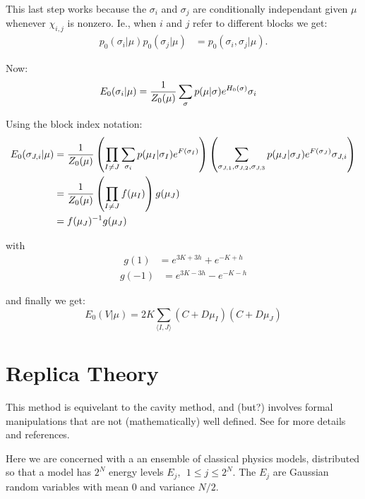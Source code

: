\documentclass[11pt]{article}
\begin{document}
This last step works because the $\sigma_i$ and $\sigma_j$ are
conditionally independant given $\mu$ whenever $\chi_{i, j}$ is
nonzero. Ie., when $i$ and $j$ refer to different blocks we get:
\begin{align*}
p_{0}(\sigma_{i} | \mu)p_{0}(\sigma_{j} | \mu) &= p_{0}(\sigma_{i}, \sigma_{j} | \mu).
\end{align*}

Now:
\begin{align*}
E_{0}(\sigma_{i} | \mu) &= {{1} \over {Z_{0}(\mu)}}\sum_{\sigma} p(\mu | \sigma)e^{H_{0}(\sigma)}\sigma_{i}
\end{align*}

Using the block index notation:
\begin{align*}
E_{0}(\sigma_{J,i} | \mu) &= {{1} \over {Z_{0}(\mu)}}\left({\prod_{I \not = J} \sum_{\sigma_{i}} p(\mu_{I} | \sigma_{I})e^{F(\sigma_{I})}}\right)\left({\sum_{\sigma_{J,1},\sigma_{J,2},\sigma_{J,3}} p(\mu_{J} | \sigma_{J})e^{F(\sigma_{J})}\sigma_{J,i}}\right)\\
 &= {{1} \over {Z_{0}(\mu)}}\left({\prod_{I \not = J} f(\mu_{I})}\right)g(\mu_{J})\\
 &= f(\mu_{J})^{-1}g(\mu_{J})
\end{align*}

with
\begin{align*}
g(1) &= e^{3K+3h}+e^{-K+h}
\end{align*}
\begin{align*}
g(-1) &= e^{3K-3h}-e^{-K-h}
\end{align*}

and finally we get:
$$\boxed{E_{0}(V | \mu) = 2K\sum_{\langle I,J\rangle} (C+D\mu_{I})(C+D\mu_{J})}$$


%
%

\section{Replica Theory}

This method is equivelant to the cavity method, and (but?)
involves formal manipulations that are not (mathematically) well defined.
See \cite{Mezard2009,Parisi2007} for more details and references.

Here we are concerned with a an ensemble of classical physics models,
distributed so that a model
has $2^N$ energy levels $E_j,\ \ 1\le j\le 2^N$. The $E_j$ are
Gaussian random variables with mean $0$ and variance $N/2.$
\end{document}
